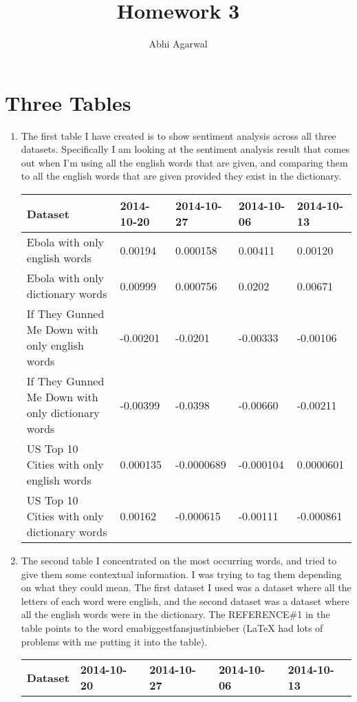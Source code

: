 \documentclass[11pt, oneside]{article}
\title{Homework 3}
\author{Abhi Agarwal}
\date{}
\begin{document}
\maketitle

\section*{Three Tables}
\begin{enumerate}
\item The first table I have created is to show sentiment analysis across all three datasets. Specifically I am looking at the sentiment analysis result that comes out when I'm using all the english words that are given, and comparing them to all the english words that are given provided they exist in the dictionary. 

\begin{tabularx}{\textwidth}{X|l|l|l|l}
\textbf{Dataset} & \textbf{2014-10-20} & \textbf{2014-10-27} & \textbf{2014-10-06} & \textbf{2014-10-13} \\
\hline Ebola with only english words & 0.00194 & 0.000158 & 0.00411 & 0.00120 \\ 
\hline Ebola with only dictionary words & 0.00999 & 0.000756 & 0.0202 & 0.00671 \\ 
\hline If They Gunned Me Down with only english words & -0.00201 & -0.0201 & -0.00333 & -0.00106 \\ 
\hline If They Gunned Me Down with only dictionary words & -0.00399 & -0.0398 & -0.00660 & -0.00211 \\ 
\hline US Top 10 Cities with only english words & 0.000135 & -0.0000689 & -0.000104 & 0.0000601 \\ 
\hline US Top 10 Cities with only dictionary words & 0.00162 & -0.000615 & -0.00111 & -0.000861 \\ 
\hline \end{tabularx}

\item The second table I concentrated on the most occurring words, and tried to give them some contextual information. I was trying to tag them depending on what they could mean. The first dataset I used was a dataset where all the letters of each word were english, and the second dataset was a dataset where all the english words were in the dictionary. The REFERENCE\#1 in the table points to the word emabiggestfansjustinbieber (LaTeX had lots of problems with me putting it into the table).

\begin{tabularx}{\textwidth}{X|l|l|l|l}
\textbf{Dataset} & \textbf{2014-10-20} & \textbf{2014-10-27} & \textbf{2014-10-06} & \textbf{2014-10-13} \\


\end{tabularx}
\end{enumerate}
\end{document}

